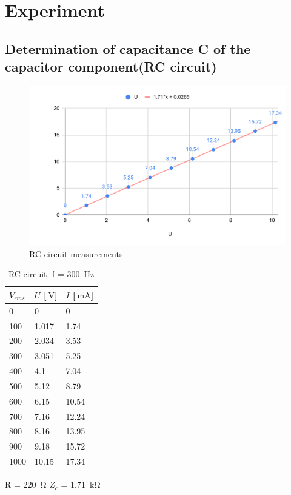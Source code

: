 \section{Experiment}

\subsection{Determination of capacitance C of the capacitor component(RC circuit)}

\begin{figure}[H]
	\centering
	\includegraphics[width=14cm]{schematics/capacitor.pdf}
	\caption{RC circuit measurements }
	\label{fig:capacitance}
\end{figure}

\begin{table}[!ht]
    \centering
    \begin{tabular}{l|l|l}

         $V_{rms}$ & $U$ [$\SI{}{\volt}$] & $I$ [$ \SI{}{\milli\ampere}$] \\ \hline
        0 & 0 & 0 \\ 
        100 & 1.017 & 1.74 \\ 
        200 & 2.034 & 3.53 \\ 
        300 & 3.051 & 5.25 \\ 
        400 & 4.1 & 7.04 \\ 
        500 & 5.12 & 8.79 \\ 
        600 & 6.15 & 10.54 \\ 
        700 & 7.16 & 12.24 \\ 
        800 & 8.16 & 13.95 \\ 
        900 & 9.18 & 15.72 \\ 
        1000 & 10.15 & 17.34 \\ 
    \end{tabular}
    \caption{RC circuit. f = \SI{300}{\hertz}} R = \SI{220}{\ohm} $Z_c$ = \SI{1.71}{\kilo\ohm}
    \label{tab:capacitance}
\end{table}

